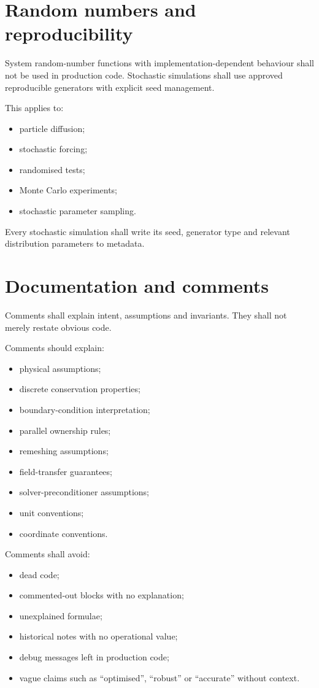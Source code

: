 \documentclass[11pt,a4paper]{article}
\begin{document}
\section{Random numbers and reproducibility}

System random-number functions with implementation-dependent behaviour shall not be used in production code. Stochastic simulations shall use approved reproducible generators with explicit seed management.

This applies to:

\begin{itemize}
  \item particle diffusion;
  \item stochastic forcing;
  \item randomised tests;
  \item Monte Carlo experiments;
  \item stochastic parameter sampling.
\end{itemize}

Every stochastic simulation shall write its seed, generator type and relevant distribution parameters to metadata.

\section{Documentation and comments}

Comments shall explain intent, assumptions and invariants. They shall not merely restate obvious code.

Comments should explain:

\begin{itemize}
  \item physical assumptions;
  \item discrete conservation properties;
  \item boundary-condition interpretation;
  \item parallel ownership rules;
  \item remeshing assumptions;
  \item field-transfer guarantees;
  \item solver-preconditioner assumptions;
  \item unit conventions;
  \item coordinate conventions.
\end{itemize}

Comments shall avoid:

\begin{itemize}
  \item dead code;
  \item commented-out blocks with no explanation;
  \item unexplained formulae;
  \item historical notes with no operational value;
  \item debug messages left in production code;
  \item vague claims such as ``optimised'', ``robust'' or ``accurate'' without context.
\end{itemize}
\end{document}
